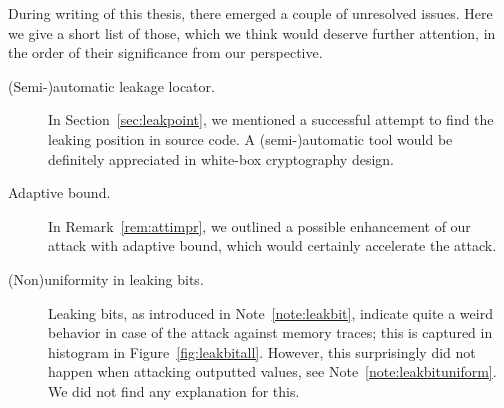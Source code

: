 During writing of this thesis, there emerged a couple of unresolved issues. Here we give a short list of those, which we think would deserve further attention, in the order of their significance from our perspective.

\begin{description}
	\item[(Semi-)automatic leakage locator.] In Section~\ref{sec:leakpoint}, we mentioned a successful attempt to find the leaking position in source code. A (semi-)automatic tool would be definitely appreciated in white-box cryptography design.
	\item[Adaptive bound.] In Remark~\ref{rem:attimpr}, we outlined a possible enhancement of our attack with adaptive bound, which would certainly accelerate the attack.
	\item[(Non)uniformity in leaking bits.] Leaking bits, as introduced in Note~\ref{note:leakbit}, indicate quite a weird behavior in case of the attack against memory traces; this is captured in histogram in Figure~\ref{fig:leakbitall}. However, this surprisingly did not happen when attacking outputted values, see Note~\ref{note:leakbituniform}. We did not find any explanation for this.
\end{description}
